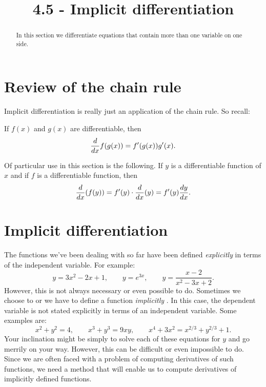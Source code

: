 \documentclass{ximera}
\title{4.5 - Implicit differentiation}
\begin{document}
\begin{abstract}
In this section we differentiate equations that contain more than one variable on one side.
\end{abstract}
\maketitle
\section{Review of the chain rule}

Implicit differentiation is really just an application of the chain rule.
So recall:

\begin{theorem}
If $f(x)$ and $g(x)$ are differentiable, then
\[
\ddx f(g(x)) = f'(g(x))g'(x).
\]
\end{theorem}

Of particular use in this section is the following.  
If $y$ is a differentiable function of $x$ and if $f$ is a differentiable function, then
\[
\ddx (f(y)) = f'(y) \cdot \ddx (y) = f'(y) \dd[y]{x}.
\]


\section{Implicit differentiation}

The functions we've been dealing with so far have been
defined \textit{explicitly}
 in terms of the independent
variable. For example:
\[
y=3x^2-2x+1,\qquad y=e^{3x}, \qquad y = \frac{x-2}{x^2-3x+2}.
\]
However, this is not always  necessary or even possible to do. Sometimes we choose to or we have to define a function  \textit{implicitly
 }. In this case, the dependent variable is not stated
explicitly in terms of an independent variable. Some examples are:
\[
x^2+y^2 = 4,\qquad x^3+y^3 = 9xy, \qquad x^4+3x^2 = x^{2/3}+y^{2/3} + 1.
\]
Your inclination might be simply to solve each of these equations for $y$ and go
merrily on your way. However, this can be difficult or even impossible to do.
Since we are often faced with a problem of computing derivatives of such functions,
we need a  method that will enable us to compute derivatives of implicitly defined functions.
  
\end{document}
